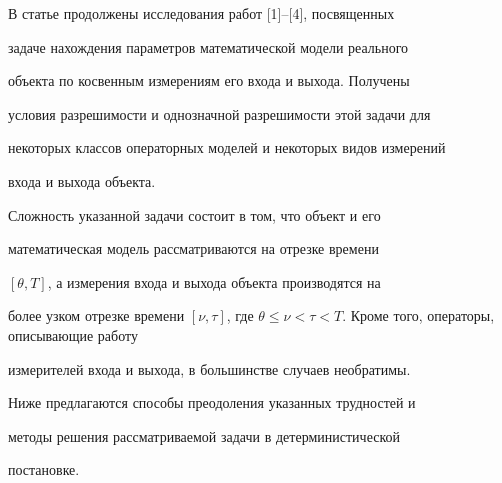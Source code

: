 \date{}




\pagestyle{plain} %







\maketitle


\label{begin}











В статье продолжены исследования работ [1]--[4], посвященных


задаче нахождения параметров математической модели реального


объекта по косвенным измерениям его входа и выхода. Получены


условия разрешимости и однозначной разрешимости этой задачи для


некоторых классов операторных моделей и некоторых видов измерений


входа и выхода объекта.





Сложность указанной задачи состоит в том, что объект и его


математическая модель рассматриваются  на отрезке времени


$[\theta, T]$, а измерения входа и выхода объекта производятся на


более узком отрезке времени $[\nu, \tau]$, где $\theta \leq


\nu<\tau <T$. Кроме того, операторы, описывающие работу


измерителей входа и выхода, в большинстве случаев необратимы.





Ниже предлагаются способы преодоления указанных трудностей и


методы решения рассматриваемой задачи в детерминистической


постановке.











